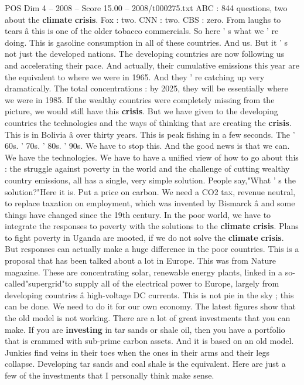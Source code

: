 \begin{textsample}{POS Dim 4 – 2008 – Score 15.00 – 2008/t000275.txt}
ABC : 844 questions, two about the \textbf{climate} \textbf{crisis}.
Fox : two.
CNN : two.
CBS : zero.
From laughs to tears â this is one of the older tobacco commercials.
So here ' s what we ' re doing.
This is gasoline consumption in all of these countries.
And us.
But it ' s not just the developed nations.
The developing countries are now following us and accelerating their pace.
And actually, their cumulative emissions this year are the equivalent to where we were in 1965.
And they ' re catching up very dramatically.
The total concentrations : by 2025, they will be essentially where we were in 1985.
If the wealthy countries were completely missing from the picture, we would still have this \textbf{crisis}.
But we have given to the developing countries the technologies and the ways of thinking that are creating the \textbf{crisis}.
This is in Bolivia â over thirty years.
This is peak fishing in a few seconds.
The ' 60s. ' 70s. ' 80s. ' 90s.
We have to stop this.
And the good news is that we can.
We have the technologies.
We have to have a unified view of how to go about this : the struggle against poverty in the world and the challenge of cutting wealthy country emissions, all has a single, very simple solution.
People say,"What ' s the solution?"Here it is.
Put a price on carbon.
We need a CO2 tax, revenue neutral, to replace taxation on employment, which was invented by Bismarck â and some things have changed since the 19th century.
In the poor world, we have to integrate the responses to poverty with the solutions to the \textbf{climate} \textbf{crisis}.
Plans to fight poverty in Uganda are mooted, if we do not solve the \textbf{climate} \textbf{crisis}.
But responses can actually make a huge difference in the poor countries.
This is a proposal that has been talked about a lot in Europe.
This was from Nature magazine.
These are concentrating solar, renewable energy plants, linked in a so-called"supergrid"to supply all of the electrical power to Europe, largely from developing countries â high-voltage DC currents.
This is not pie in the sky ; this can be done.
We need to do it for our own economy.
The latest figures show that the old model is not working.
There are a lot of great investments that you can make.
If you are \textbf{investing} in tar sands or shale oil, then you have a portfolio that is crammed with sub-prime carbon assets.
And it is based on an old model.
Junkies find veins in their toes when the ones in their arms and their legs collapse.
Developing tar sands and coal shale is the equivalent.
Here are just a few of the investments that I personally think make sense.

\end{textsample}
